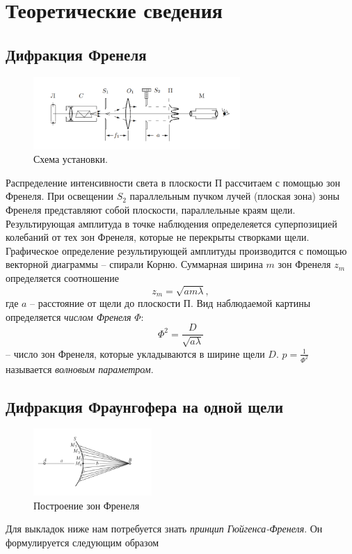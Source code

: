 \documentclass[a4paper, 12pt]{article}%
\begin{document}
\section{Теоретические сведения}
\subsection{Дифракция Френеля}
\begin{figure}[h]
\includegraphics[width=0.7\textwidth]{pics/1.png}
\centering
\caption{Схема установки.}
\end{figure}
Распределение интенсивности света в плоскости П рассчитаем с помощью зон Френеля. При освещении $S_2$ параллельным пучком лучей (плоская зона) зоны Френеля представляют собой плоскости, параллельные краям щели. Результирующая амплитуда в точке наблюдения определеяется суперпозицией колебаний от тех зон Френеля, которые не перекрыты створками щели. Графическое определение результирующей амплитуды производится с помощью векторной диаграммы -- спирали Корню. Суммарная ширина $m$ зон Френеля $z_m$ определяется соотношение
\begin{equation}
z_m = \sqrt{am\lambda},
\end{equation}
где $a$ -- расстояние от щели до плоскости П. Вид наблюдаемой картины определяется \textit{числом Френеля} $\Phi$:
$$
\Phi^2 = \dfrac{D}{\sqrt{a\lambda}}
$$
-- число зон Френеля, которые укладываются в ширине щели $D$. $p = \frac{1}{\Phi^2}$ называется \textit{волновым параметром}. 

\newpage

\subsection{Дифракция Фраунгофера на одной щели}

\begin{figure}
  \begin{center}
    \includegraphics[width = 0.4\textwidth]{pics/2.png}
  \end{center}
  \caption{Построение зон Френеля}
\end{figure}
Для выкладок ниже нам потребуется знать \textit{принцип Гюйгенса-Френеля}. Он формулируется следующим образом 
\end{document}

